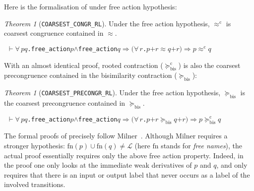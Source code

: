 \documentclass[GCNS]{yincog}
\renewcommand{\HOLConst}[1]{\texttt{#1}}
\renewcommand{\HOLBoundVar}[1]{\ensuremath{\mathit{#1}}}
\renewcommand{\HOLSymConst}[1]{#1}
\renewcommand{\HOLTokenConj}{\ensuremath{\wedge}}
\renewcommand{\HOLTokenForall}{\ensuremath{\forall \,}}
\renewcommand{\HOLTokenTurnstile}{\ensuremath{\:\:\vdash}}
\theoremstyle{remark}
\theoremstyle{theorem}
\newtheorem{theorem}[definition]{Theorem}
\theoremstyle{remark}
\newcommand{\HOLTokenWeakEQ}{$\approx$}
\newcommand{\HOLTokenObsCongr}{$\approx^{\mathrm{c}}\!$}
\newcommand{\HOLTokenContracts}{$\succeq_{\mathrm{bis}}\!$}
\newcommand{\HOLTokenObsContracts}{$\succeq^{\mathrm{c}}_{\mathrm{bis}}\!$}
\renewcommand{\HOLTokenImp}{\ensuremath{\Longrightarrow}}
\newcommand{\rapprox}{\mathrel{\approx^{\mathrm{c}}}}
\newcommand{\wbvtex}{\approx}
\newcommand{\contr}{\mathrel{\succeq_{\mathrm{bis}}}}
\newcommand{\mcontrBIS}{\mathrel{\succeq_{\mathrm{bis}}}}
\newcommand{\rcontr}{\mathrel{\succeq^{\mathrm{c}}_{\mathrm{bis}}}}
\begin{document}
Here is the formalisation of  under free action hypothesis:\vspace{-3pt}
%
\begin{theorem}[\texttt{COARSEST\_CONGR\_RL}]
 \label{thm:coarsestR}
Under the free action hypothesis, $\rapprox $ is coarsest congruence contained
in $\wbvtex $.\vspace{-3pt}
%
\begin{alltt}
\HOLTokenTurnstile{} \HOLSymConst{\HOLTokenForall{}}\HOLBoundVar{p} \HOLBoundVar{q}. \HOLConst{free\_action} \HOLBoundVar{p} \HOLSymConst{\HOLTokenConj{}} \HOLConst{free\_action} \HOLBoundVar{q} \HOLSymConst{\HOLTokenImp{}} \ensuremath{(}\HOLSymConst{\HOLTokenForall{}}\HOLBoundVar{r}. \HOLBoundVar{p} \HOLSymConst{\ensuremath{+}} \HOLBoundVar{r} \HOLSymConst{\HOLTokenWeakEQ} \HOLBoundVar{q} \HOLSymConst{\ensuremath{+}} \HOLBoundVar{r}\ensuremath{)} \HOLSymConst{\HOLTokenImp{}} \HOLBoundVar{p} \HOLSymConst{\HOLTokenObsCongr} \HOLBoundVar{q}
\end{alltt}
%
\end{theorem}

With an almost identical proof, rooted contraction ($\rcontr $) is also
the coarsest precongruence contained in the bisimilarity contraction ($
\mcontrBIS $):
%
\begin{theorem}[\texttt{COARSEST\_PRECONGR\_RL}]
 \label{thm:coarsestPre}
Under the free action hypothesis, $\mcontrBIS $ is the coarsest precongruence
contained in $\contr $.
%
\begin{alltt}
\HOLTokenTurnstile{} \HOLSymConst{\HOLTokenForall{}}\HOLBoundVar{p} \HOLBoundVar{q}. \HOLConst{free\_action} \HOLBoundVar{p} \HOLSymConst{\HOLTokenConj{}} \HOLConst{free\_action} \HOLBoundVar{q} \HOLSymConst{\HOLTokenImp{}} \ensuremath{(}\HOLSymConst{\HOLTokenForall{}}\HOLBoundVar{r}. \HOLBoundVar{p} \HOLSymConst{\ensuremath{+}} \HOLBoundVar{r} \HOLSymConst{\HOLTokenContracts{}} \HOLBoundVar{q} \HOLSymConst{\ensuremath{+}} \HOLBoundVar{r}\ensuremath{)} \HOLSymConst{\HOLTokenImp{}} \HOLBoundVar{p} \HOLSymConst{\HOLTokenObsContracts} \HOLBoundVar{q}
\end{alltt}
%
\end{theorem}

The formal proofs of  precisely follow Milner~\citep[p.~153--154]{Mil89}.
Although Milner requires a stronger hypothesis:
$\mathrm{fn}(p) \cup \mathrm{fn}(q) \neq \mathscr{L}$ (here
$\mathrm{fn}$ stands for \emph{free names}), the actual proof essentially
requires only the above free action property. Indeed, in the proof one
only looks at the immediate weak derivatives of $p$ and $q$, and only requires
that there is an input or output label that never occurs as a label of
the involved transitions.
\end{document}
